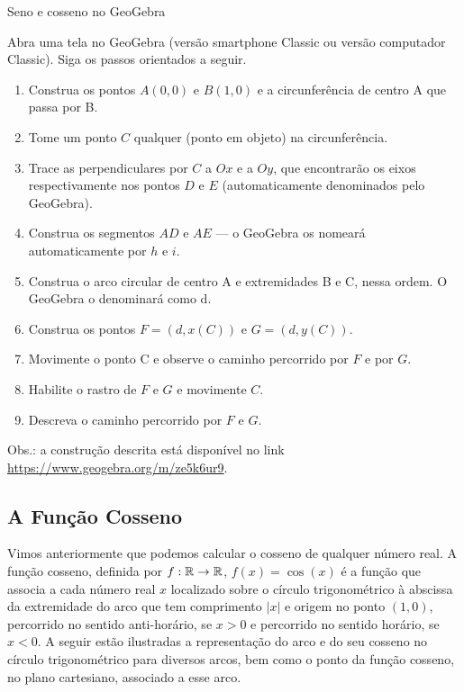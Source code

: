 \begin{task}{Seno e cosseno no GeoGebra}
\label{trig-ativ17}

Abra uma tela no GeoGebra (versão smartphone Classic ou versão computador Classic). Siga os passos orientados a seguir.
\begin{enumerate}
\item Construa os pontos $A(0,0)$ e $B(1,0)$ e a circunferência de centro A que passa por B.
\item Tome um ponto $C$ qualquer (ponto em objeto) na circunferência.
\item Trace as perpendiculares por $C$ a $Ox$ e a $Oy$, que encontrarão os eixos respectivamente nos pontos $D$ e $E$ (automaticamente denominados pelo GeoGebra).
\item Construa os segmentos $AD$ e $AE$ --- o GeoGebra os nomeará automaticamente por $h$ e $i$.
\item Construa o arco circular de centro A e extremidades B e C, nessa ordem. O GeoGebra o denominará como d.
\item Construa os pontos $F=(d,x(C))$ e $G=(d,y(C))$.
\item Movimente o ponto C e observe o caminho percorrido por $F$ e por $G$.
\item Habilite o rastro de $F$ e $G$ e movimente $C$.
\item Descreva o caminho percorrido por $F$ e $G$.
\end{enumerate}

Obs.: a construção descrita está disponível no link \url{https://www.geogebra.org/m/ze5k6ur9}.
\end{task}

\subsection{A Função Cosseno}

Vimos anteriormente que podemos calcular o cosseno de qualquer número real. A função cosseno, definida por $f:\mathbb{R}\to\mathbb{R}$, $f(x) = \cos(x)$ é a função que associa a cada número real $x$ localizado sobre o círculo trigonométrico à abscissa da extremidade do arco que tem comprimento $|x|$ e origem no ponto $(1,0)$, percorrido no sentido anti-horário, se $x>0$ e percorrido no sentido horário, se $x<0$. A seguir estão ilustradas a representação do arco e do seu cosseno no círculo trigonométrico para diversos arcos, bem como o ponto da função cosseno, no plano cartesiano, associado a esse arco.

